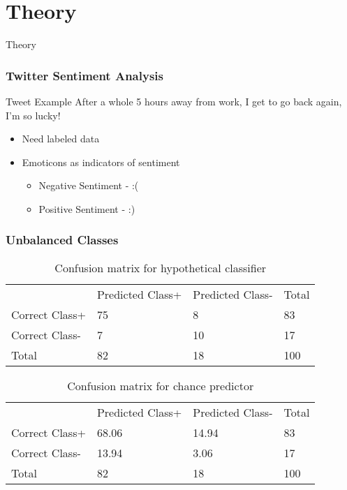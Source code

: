 \section{Theory}

\begin{frame}
        \centering
        \huge Theory
\end{frame}

\begin{frame}
	\frametitle{Twitter Sentiment Analysis}
	\begin{block}{Tweet Example}
		After a whole 5 hours away from work, I get to go back again, I’m so lucky!
	\end{block}
	\begin{itemize}
		\item Need labeled data
		\item Emoticons as indicators of sentiment
		\begin{itemize}
			\item Negative Sentiment - :(
			\item Positive Sentiment - :)
		\end{itemize}
	\end{itemize}
\end{frame}

\begin{frame}
	\frametitle{Unbalanced Classes}
	\begin{table}[htb]
		\centering
		\begin{tabular}{llll}
			\multicolumn{1}{c}{} & Predicted Class+ & Predicted Class- & Total \\ \cmidrule{2-4}
			Correct Class+	& \num{75}	& \num{8}	& 83\\
			Correct Class-	& \num{7}	& \num{10}	& 17\\ \cmidrule{1-4}
			Total			& 82		& 18		& 100
		\end{tabular}
		\caption{Confusion matrix for hypothetical classifier}
	\end{table}

	\begin{table}[htb]
		\centering
		\begin{tabular}{llll}
			\multicolumn{1}{c}{} & Predicted Class+ & Predicted Class- & Total \\ \cmidrule{2-4}
			Correct Class+	& \num{68.06}	& \num{14.94}	& 83\\
			Correct Class-	& \num{13.94}	& \num{3.06}	& 17\\ \cmidrule{1-4}
			Total			& 82		& 18		& 100
		\end{tabular}
		\caption{Confusion matrix for chance predictor}
	\end{table}
\end{frame}

